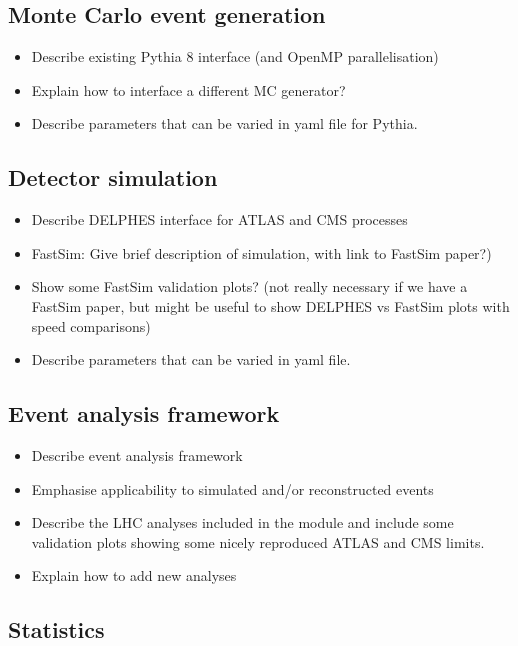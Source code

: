 \documentclass[11pt,a4paper]{article}
\begin{document}
\subsection{Monte Carlo event generation}

\begin{itemize}
\item Describe existing Pythia 8 interface (and OpenMP parallelisation)
\item Explain how to interface a different MC generator?
\item Describe parameters that can be varied in yaml file for Pythia.
\end{itemize}

\subsection{Detector simulation}

\begin{itemize}
\item Describe DELPHES interface for ATLAS and CMS processes
\item FastSim: Give brief description of simulation, with link to FastSim paper?)
\item Show some FastSim validation plots? (not really necessary if we have a FastSim paper, but might be useful to show DELPHES vs FastSim plots with speed comparisons)
\item Describe parameters that can be varied in yaml file.
\end{itemize}

\subsection{Event analysis framework}

\begin{itemize}
\item Describe event analysis framework
\item Emphasise applicability to simulated and/or reconstructed events
\item Describe the LHC analyses included in the module and include some validation plots showing some nicely reproduced ATLAS and CMS limits.
\item Explain how to add new analyses
\end{itemize}

\subsection{Statistics}
\end{document}
